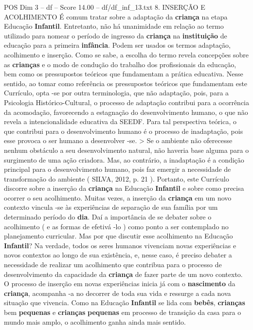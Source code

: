 \begin{textsample}{POS Dim 3 – df – Score 14.00 – df/df\_inf\_13.txt}  \label{ex:f3_pos_128}
8.
INSERÇÃO E ACOLHIMENTO É comum tratar sobre a adaptação da \textbf{criança} na etapa Educação \textbf{Infantil}.
Entretanto, não há unanimidade em relação ao termo utilizado para nomear o período de ingresso da \textbf{criança} na \textbf{instituição} de educação para a primeira \textbf{infância}.
Podem ser usados os termos adaptação, acolhimento e inserção.
Como se sabe, a escolha do termo revela concepções sobre as \textbf{crianças} e o modo de condução do trabalho dos profissionais da educação, bem como os pressupostos teóricos que fundamentam a prática educativa.
Nesse sentido, ao tomar como referência os pressupostos teóricos que fundamentam este Currículo, opta -se por outra terminologia, que não adaptação, pois, para a Psicologia Histórico-Cultural, o processo de adaptação contribui para a ocorrência da acomodação, favorecendo a estagnação do desenvolvimento humano, o que não revela a intencionalidade educativa da SEEDF.
Para tal perspectiva teórica, o que contribui para o desenvolvimento humano é o processo de inadaptação, pois esse provoca o ser humano a desenvolver -se. > Se o ambiente não oferecesse nenhum obstáculo a seu desenvolvimento natural, não haveria base alguma para o surgimento de uma ação criadora.
Mas, ao contrário, a inadaptação é a condição principal para o desenvolvimento humano, pois faz emergir a necessidade de transformação do ambiente ( SILVA, 2012, p. 21 ).
Portanto, este Currículo discorre sobre a inserção da \textbf{criança} na Educação \textbf{Infantil} e sobre como precisa ocorrer o seu acolhimento.
Muitas vezes, a inserção da \textbf{criança} em um novo contexto vincula -se às experiências de separação de sua família por um determinado período do \textbf{dia}.
Daí a importância de se debater sobre o acolhimento ( e as formas de efetivá -lo ) como ponto a ser contemplado no planejamento curricular.
Mas por que discutir esse acolhimento na Educação \textbf{Infantil}?
Na verdade, todos os seres humanos vivenciam novas experiências e novos contextos ao longo de sua existência, e, nesse caso, é preciso debater a necessidade de realizar um acolhimento que contribua para o processo de desenvolvimento da capacidade da \textbf{criança} de fazer parte de um novo contexto.
O processo de inserção em novas experiências inicia já com o \textbf{nascimento} da \textbf{criança}, acompanha -a no decorrer de toda sua vida e ressurge a cada nova situação que vivencia.
Como na Educação \textbf{Infantil} se lida com \textbf{bebês}, \textbf{crianças} bem \textbf{pequenas} e \textbf{crianças} \textbf{pequenas} em processo de transição da casa para o mundo mais amplo, o acolhimento ganha ainda mais sentido.

\end{textsample}
